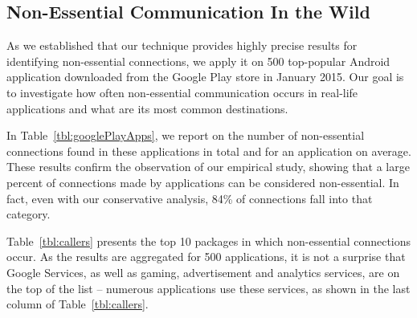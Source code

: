 \subsection{Non-Essential Communication In the Wild}
As we established that our technique provides highly precise results for identifying non-essential connections,
we apply it on 500 top-popular Android application downloaded from the Google Play store in January 2015. 
Our goal is to investigate how often non-essential communication occurs in real-life applications and what are its most common destinations. 

In Table~\ref{tbl:googlePlayApps}, we report on the number of non-essential connections found in these applications in total and for an application on average. 
These results confirm the observation of our empirical study, showing that a large percent of connections made by applications can be considered non-essential. 
In fact, even with our conservative analysis, 84\% of connections fall into that category. 

Table~\ref{tbl:callers} presents the top 10 packages in which non-essential connections occur.
As the results are aggregated for 500 applications, it is not a surprise that Google Services, as well as gaming, advertisement and analytics services, are on the top of the list -- numerous applications use these services, as shown in the last column of Table~\ref{tbl:callers}. 







